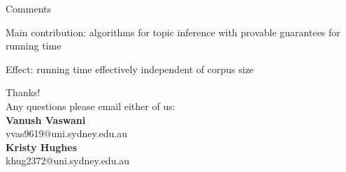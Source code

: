 \documentclass{lecture}
\begin{document}
\begin{plain}{Comments}
\begin{itemize}
\p Main contribution: algorithms for topic inference with provable guarantees for running time
\begin{itemize}
\p Effect: running time effectively independent of corpus size
\end{itemize}
\end{itemize}
\end{plain}


\begin{plain}{}
\begin{center}
\Huge
Thanks!\\
\vspace{3ex}
\Large
Any questions please email either of us:\\
\vspace{2ex}
\large
\textbf{Vanush Vaswani}\\
\normalsize
vvas9619@uni.sydney.edu.au\\
\vspace{1ex}
\large
\textbf{Kristy Hughes}\\
\normalsize
khug2372@uni.sydney.edu.au
\end{center}
\end{plain}
\end{document}
